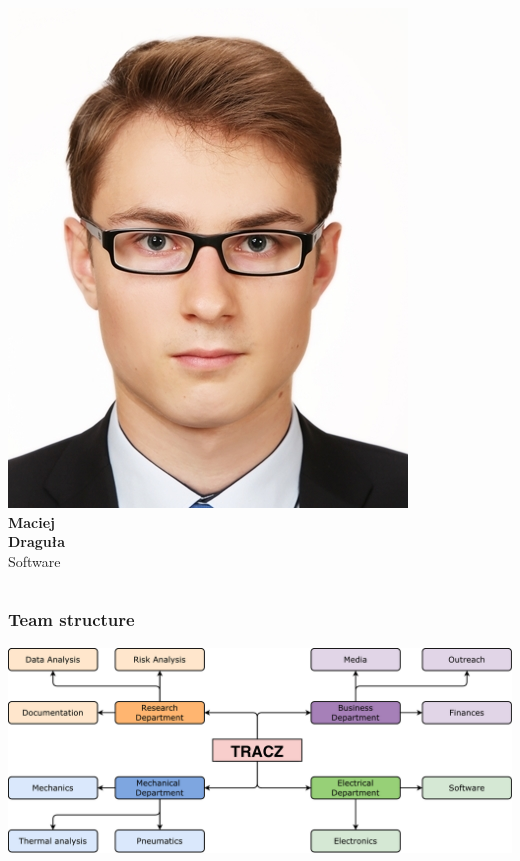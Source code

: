 \documentclass[xcolor=dvipsnames]{beamer}%
\begin{document}
\begin{frame}
\begin{columns}
\begin{minipage}[c][0.3\textheight][c]{\linewidth}
    \includegraphics[height=0.2\textheight]{figure/Maciek.jpg} \\
    \textbf{Maciej}\\\textbf{Draguła}\\
    Software
\end{minipage}

\end{columns}	
\end{frame}%

\begin{frame}
\frametitle{Team structure}
	\centering
    \includegraphics[width=\textwidth]{figure/TraczTeam.pdf}
\end{frame}

\end{document}
